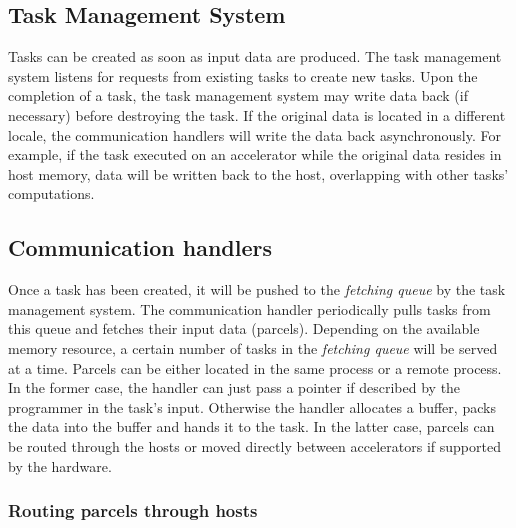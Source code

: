 \subsection{Task Management System}
Tasks can be created as soon as input data are produced.
The task management system listens for requests from existing tasks to create new tasks.
Upon the completion of a task, the task management system may write data back (if necessary) before destroying the task.
If the original data is located in a different locale, the communication handlers will write the data back asynchronously.
For example, if the task executed on an accelerator while the original data resides in host memory, data will be written back to the host, overlapping with other tasks' computations.

\subsection{Communication handlers}
Once a task has been created, it will be pushed to the {\em fetching queue} by the task management system.
The communication handler periodically pulls tasks from this queue and fetches their input data (parcels).
Depending on the available memory resource, a certain number of tasks in the {\em fetching queue} will be served at a time.
Parcels can be either located in the same process or a remote process.
In the former case, the handler can just pass a pointer if described by the programmer in the task's input.
Otherwise the handler allocates a buffer, packs the data into the buffer and hands it to the task.
In the latter case, parcels can be routed through the hosts or moved directly between accelerators if supported by the hardware.

\subsubsection{Routing parcels through hosts}

